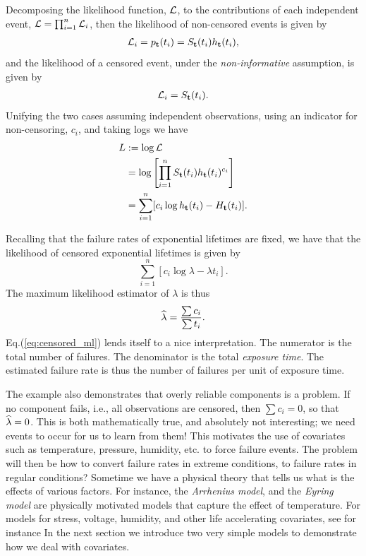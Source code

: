 Decomposing the likelihood function, $\mathcal{L}$, to the contributions of each independent event, $\mathcal{L}=\prod_{i=1}^n \mathcal{L}_i$, then the likelihood of non-censored events is given by
\begin{align}
	\mathcal{L}_i=p_{\mathbf{t}}(t_i)= S_{\mathbf{t}} (t_i) h_{\mathbf{t}} (t_i),
\end{align}
and the likelihood of a censored event, under the \emph{non-informative} assumption, is given by 
\begin{align}
	\mathcal{L}_i=S_{\mathbf{t}} (t_i) .
\end{align}
Unifying the two cases assuming independent observations, using an indicator for non-censoring, $c_i$, and taking logs we have
\begin{align}
	L &:=\log \mathcal{L}\\ 
	&= \log \left[\prod_{i=1}^{n} S_{\mathbf{t}} (t_i) h_{\mathbf{t}} (t_i)^{c_i}\right] \\
	&= \sum_{i=1}^{n} [c_i \log h_{\mathbf{t}} (t_i) - H_{\mathbf{t}} (t_i)]. \label{eq:censored_likelihood}
\end{align}


\begin{example}
\label{ex:censoring}
Recalling that the failure rates of exponential lifetimes are fixed, we have that the likelihood of censored exponential lifetimes is given by 
$$
	\sum_{i=1}^{n} [c_i \log \lambda - \lambda t_i].
$$
The maximum likelihood estimator of $\lambda$ is thus
\begin{align}
	\widehat{\lambda}= \frac{\sum c_i}{\sum t_i}. \label{eq:censored_ml}
\end{align}
Eq.(\ref{eq:censored_ml}) lends itself to a nice interpretation.
The numerator is the total number of failures.
The denominator is the total \emph{exposure time}. 
The estimated failure rate is thus the number of failures per unit of exposure time. 
\end{example}

The example also demonstrates that overly reliable components is a problem. 
If no component fails, i.e., all observations are censored, then $\sum c_i=0$, so that $\widehat{\lambda}=0$. 
This is both mathematically true, and absolutely not interesting; we need events to occur for us to learn from them!
This motivates the use of covariates such as temperature, pressure, humidity, etc. to force failure events. 
The problem will then be how to convert failure rates in extreme conditions, to failure rates in regular conditions?
Sometime we have a physical theory that tells us what is the effects of various factors.
For instance, the \emph{Arrhenius model}, and the \emph{Eyring model} are physically motivated models that capture the effect of temperature.
For models for stress, voltage, humidity, and other life accelerating covariates, see for instance \cite[Sec.8.1.5]{natrella_nist/sematech_2010}
In the next section we introduce two very simple models to demonstrate how we deal with covariates. 



